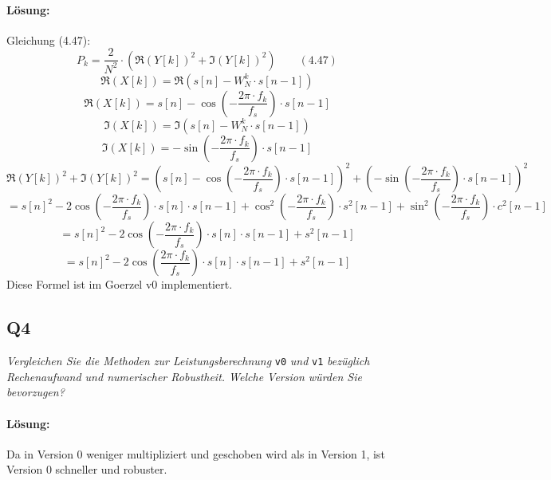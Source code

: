 \documentclass[a4,paper,fleqn]{article}
\begin{document}
\paragraph{Lösung: }
Gleichung (4.47):
\[
    P_k =
    \frac{2}{N^2} \cdot
    \left(
        \Re(Y[k])^2 + \Im(Y[k])^2
    \right)
    \qquad (4.47)
\]
\[
\Re(X[k]) = \Re(s[n] - W^k_N \cdot s[n-1])
\]
\[
\Re(X[k]) = s[n] - \cos\left(-\frac{2 \pi\cdot f_k}{f_s}\right)\cdot s[n-1]
\]
\[
\Im(X[k]) = \Im(s[n] - W^k_N \cdot s[n-1])
\]
\[
\Im(X[k]) = -\sin\left(-\frac{2 \pi\cdot f_k}{f_s}\right)\cdot s[n-1]
\]
\[
        \Re(Y[k])^2 + \Im(Y[k])^2 = \left(s[n] - \cos\left(-\frac{2 \pi\cdot f_k}{f_s}\right)\cdot s[n-1] \right)^2 + \left( -\sin\left(-\frac{2 \pi\cdot f_k}{f_s}\right)\cdot s[n-1]\right)^2
\]
\[
 = s[n]^2 - 2\cos\left(-\frac{2\pi \cdot f_k}{f_s}\right)\cdot s[n]\cdot s[n-1] + \cos^2\left(-\frac{2\pi\cdot f_k}{f_s}\right)\cdot s^2[n-1] + \sin^2\left(-\frac{2\pi\cdot f_k}{f_s}\right)\cdot c^2[n-1]
\]
\[
 = s[n]^2 - 2\cos\left(-\frac{2\pi \cdot f_k}{f_s}\right)\cdot s[n]\cdot s[n-1] + s^2[n-1]
\]
\[
 = s[n]^2 - 2\cos\left(\frac{2\pi \cdot f_k}{f_s}\right)\cdot s[n]\cdot s[n-1] + s^2[n-1]
\]
Diese Formel ist im Goerzel v0 implementiert.

\subsection{Q4}
\label{q4}
\emph{Vergleichen Sie die Methoden zur Leistungsberechnung}
\verb?v0?
\emph{und}
\verb?v1?
\emph{bezüglich Rechenaufwand und numerischer Robustheit. Welche Version 
würden Sie bevorzugen?}
\paragraph{Lösung: }
Da in Version 0  weniger multipliziert und geschoben wird als in Version 1, ist Version 0 schneller und robuster.
\end{document}
